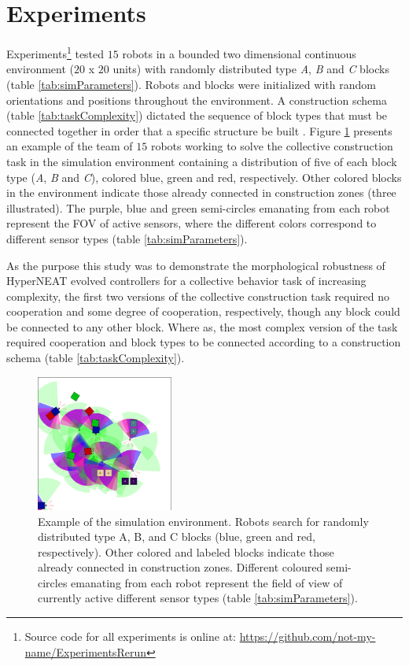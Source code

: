 \documentclass[conference]{IEEEtran}
\begin{document}
\section{Experiments}\label{sec:experiments}

Experiments\footnote{Source code for all experiments is online at: \url{https://github.com/not-my-name/ExperimentsRerun}}
tested $15$ robots in a bounded two dimensional continuous environment
($20$ x $20$ units) with randomly distributed type \textit{A}, \textit{B} and
\textit{C} blocks (table \ref{tab:simParameters}).
Robots and blocks were initialized with random orientations and positions throughout the environment.
A construction schema (table \ref{tab:taskComplexity}) dictated the sequence of block
types that must be connected together in order that a specific structure be built \cite{NitschkeSaEC2012}.
Figure \ref{fig:taskEnv} presents an example of the team of $15$ robots working to solve the
collective construction task in the simulation environment containing a distribution of five of each
block type (\textit{A}, \textit{B} and \textit{C}), colored blue, green and red, respectively.
Other colored blocks in the environment indicate those already connected in construction zones
(three illustrated).  The purple, blue and green semi-circles emanating from each robot
represent the FOV of active sensors, where the different colors correspond to different
sensor types (table \ref{tab:simParameters}).

As the purpose this study was to demonstrate the morphological robustness of
HyperNEAT evolved controllers for a collective behavior task of increasing complexity,
the first two versions of the collective construction task required no cooperation and some degree of
cooperation, respectively, though any block could be connected to any other block.
Where as, the most complex version of the task required cooperation and block types
to be connected according to a construction schema (table \ref{tab:taskComplexity}).

\begin{figure}[t]
	\centering
	\includegraphics[width=0.40\textwidth]{TaskEnv.eps}
\caption{Example of the simulation environment.  Robots search for randomly distributed
type A, B, and C blocks (blue, green and red, respectively).  Other colored and labeled
blocks indicate those already connected in construction zones.
Different coloured semi-circles emanating from each
robot represent the field of view of currently active different sensor types (table \ref{tab:simParameters}).}\label{fig:taskEnv}
\end{figure}
\end{document}
